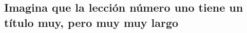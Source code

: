 \subsection{Imagina que la lección número uno tiene un t\'itulo muy, pero muy muy largo}

\begin{opening}\blindtext\end{opening}

\Blindtext

\begin{closing}\blindtext\end{closing}
\begin{problemas}\Blindenumerate[3]\end{problemas}